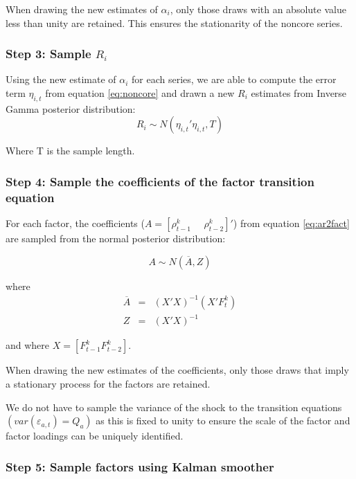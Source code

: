 \documentclass[11pt,english,a4paper]{article}
\begin{document}
When drawing the new estimates of $\alpha_{i}$, only those draws with an absolute value less than unity are retained. This ensures the stationarity of the noncore series.


\subsubsection*{Step 3: Sample $R_{i}$}

Using the new estimate of $\alpha_{i}$ for each series, we are able to compute the error term $\eta_{i,t}$ from equation \ref{eq:noncore} and drawn a new $R_{i}$ estimates from Inverse Gamma posterior distribution:
\begin{equation*}
 R_{i} \sim N( \eta_{i,t}'\eta_{i,t} ,T)
\end{equation*}

Where T is the sample length.



\subsubsection*{Step 4: Sample the coefficients of the factor transition equation}

For each factor, the coefficients ($A = [\rho^{k}_{t-1} \: \: \: \: \: \: \rho^{k}_{t-2}]'$) from equation \ref{eq:ar2fact} are sampled from the normal posterior distribution:

\begin{equation*}
 A \sim N( \overline{A} , Z)
\end{equation*}

where
\begin{eqnarray*}
    \overline{A} &=& \left( X'X   \right)^{-1}     \left(   X' F^{k}_{t} \right) \\
    Z &=& \left(  X'X  \right)^{-1}
\end{eqnarray*}

and where $X =[F^{k}_{t-1} F^{k}_{t-2}]$.

When drawing the new estimates of the coefficients, only those draws that imply a stationary process for the factors are retained.

We do not have to sample the variance of the shock to the transition equations $(var\left( \varepsilon_{a,t} \right) =Q_{a})$ as this is fixed to unity to ensure the scale of the factor and factor loadings can be uniquely identified.

\subsubsection*{Step 5: Sample factors using Kalman smoother}
\end{document}
